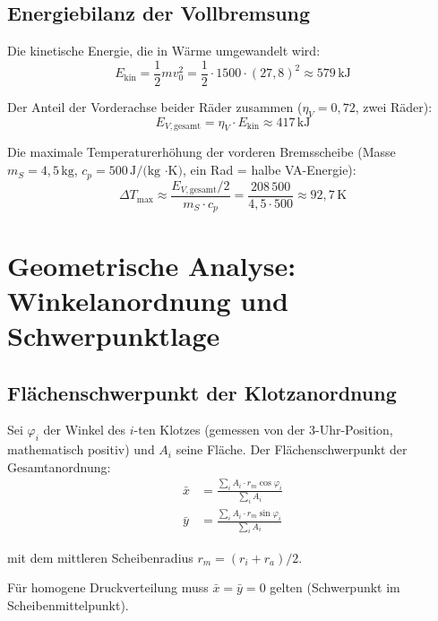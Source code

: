﻿\documentclass[12pt,a4paper]{article}
\theoremstyle{definition}
\begin{document}
\subsection{Energiebilanz der Vollbremsung}

Die kinetische Energie, die in Wärme umgewandelt wird:
\begin{equation}
  E_{\text{kin}} = \frac{1}{2} m v_0^2
  = \frac{1}{2} \cdot 1500 \cdot (27{,}8)^2
  \approx 579\,\text{kJ}
  \label{eq:ekin}
\end{equation}

Der Anteil der Vorderachse beider Räder zusammen ($\eta_V = 0{,}72$,
zwei Räder):
\begin{equation}
  E_{V,\text{gesamt}} = \eta_V \cdot E_{\text{kin}} \approx 417\,\text{kJ}
  \label{eq:E_VA}
\end{equation}

Die maximale Temperaturerhöhung der vorderen Bremsscheibe
(Masse $m_S = 4{,}5\,\text{kg}$, $c_p = 500\,\text{J/(kg ·K)}$,
ein Rad = halbe VA-Energie):
\begin{equation}
  \Delta T_{\max} \approx \frac{E_{V,\text{gesamt}} / 2}{m_S \cdot c_p}
  = \frac{208\,500}{4{,}5 \cdot 500} \approx 92{,}7\,\text{K}
  \label{eq:deltaT}
\end{equation}

\section{Geometrische Analyse: Winkelanordnung und Schwerpunktlage}

\subsection{Flächenschwerpunkt der Klotzanordnung}

Sei $\varphi_i$ der Winkel des $i$-ten Klotzes (gemessen von der
3-Uhr-Position, mathematisch positiv) und $A_i$ seine Fläche.
Der Flächenschwerpunkt der Gesamtanordnung:
\begin{align}
  \bar{x} &= \frac{\sum_i A_i \cdot r_m \cos\varphi_i}{\sum_i A_i}
  \label{eq:sx} \\[4pt]
  \bar{y} &= \frac{\sum_i A_i \cdot r_m \sin\varphi_i}{\sum_i A_i}
  \label{eq:sy}
\end{align}

mit dem mittleren Scheibenradius $r_m = (r_i + r_a)/2$.

Für homogene Druckverteilung muss $\bar{x} = \bar{y} = 0$ gelten
(Schwerpunkt im Scheibenmittelpunkt).
\end{document}

